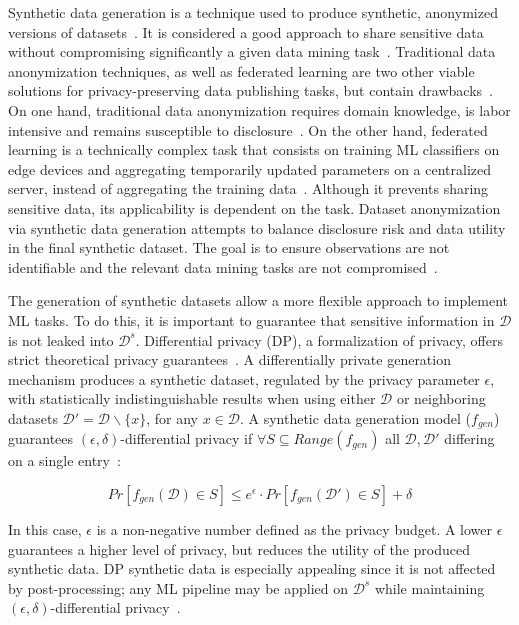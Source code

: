 Synthetic data generation is a technique used to produce synthetic, anonymized
versions of datasets~\cite{dankar2021fake}. It is considered a good approach
to share sensitive data without compromising significantly a given data mining
task~\cite{taub2018differential, park2018data}. Traditional data anonymization
techniques, as well as federated learning are two other viable solutions for
privacy-preserving data publishing tasks, but contain
drawbacks~\cite{hernandez2022synthetic}. On one hand, traditional data
anonymization requires domain knowledge, is labor intensive and remains
susceptible to disclosure~\cite{reiter2004new}. On the other hand, federated
learning is a technically complex task that consists on training ML
classifiers on edge devices and aggregating temporarily updated parameters on
a centralized server, instead of aggregating the training
data~\cite{yu2022survey}. Although it prevents sharing sensitive data, its
applicability is dependent on the task. Dataset anonymization via synthetic
data generation attempts to balance disclosure risk and data utility in the
final synthetic dataset. The goal is to ensure observations are not
identifiable and the relevant data mining tasks are not
compromised~\cite{singh2017aggregating, li2018privacy}.

The generation of synthetic datasets allow a more flexible approach to
implement ML tasks. To do this, it is important to guarantee that sensitive
information in $\mathcal{D}$ is not leaked into $\mathcal{D}^s$. Differential
privacy (DP), a formalization of privacy, offers strict theoretical privacy
guarantees~\cite{rosenblatt2020differentially}. A differentially private
generation mechanism produces a synthetic dataset, regulated by the privacy
parameter $\epsilon$, with statistically indistinguishable results when using
either $\mathcal{D}$ or neighboring datasets $\mathcal{D}' = \mathcal{D}
\backslash \{x\}$, for any $x \in \mathcal{D}$. A synthetic data generation
model ($f_{gen}$) guarantees $(\epsilon, \delta)$-differential privacy if
$\forall S \subseteq Range(f_{gen})$ all $\mathcal{D}, \mathcal{D}'$ differing
on a single entry~\cite{hardt2012simple}:

\begin{equation}
    Pr[f_{gen}(\mathcal{D}) \in S] \le e^{\epsilon} \cdot
    Pr[f_{gen}(\mathcal{D}') \in S] + \delta
\end{equation}
 
In this case, $\epsilon$ is a non-negative number defined as the privacy
budget. A lower $\epsilon$ guarantees a higher level of privacy, but reduces
the utility of the produced synthetic data. DP synthetic data is especially
appealing since it is not affected by post-processing; any ML pipeline may be
applied on $\mathcal{D}^s$ while maintaining $(\epsilon, \delta)$-differential
privacy~\cite{dwork2014algorithmic}.

